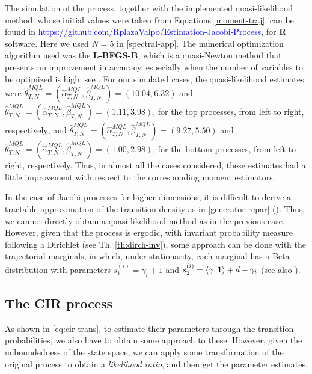 \documentclass[12pt]{article}
\begin{document}
The simulation of the process, together with the implemented quasi-likelihood method, whose initial values were taken from Equations \eqref{moment-traj}, can be found in \textcolor{blue}{https://github.com/RplazaValpo/Estimation-Jacobi-Process}, for \textbf{R} software. Here we used $N=5$ in \eqref{spectral-app}. The numerical optimization algorithm used was the \textbf{L-BFGS-B}, which is a quasi-Newton method that presents an improvement in accuracy, especially when the number of variables to be optimized is high; see \citep{byrd1995limited}.
For our simulated cases, the quasi-likelihood estimates were $\hat{\theta}_{T,N}^{MQL}=(\hat{\alpha}_{T,N}^{MQL},\hat{\beta}_{T,N}^{MQL})=(10.04, 6.32)$ and $\hat{\theta}_{T,N}^{MQL}=(\hat{\alpha}_{T,N}^{MQL},\hat{\beta}_{T,N}^{MQL})=(1.11, 3.98)$, for the top processes, from left to right, respectively; and $\hat{\theta}_{T,N}^{MQL}=(\hat{\alpha}_{T,N}^{MQL},\hat{\beta}_{T,N}^{MQL})=(9.27, 5.50)$ and $\hat{\theta}_{T,N}^{MQL}=(\hat{\alpha}_{T,N}^{MQL},\hat{\beta}_{T,N}^{MQL})=(1.00, 2.98)$,  for the bottom processes, from left to right, respectively. Thus, in almost all the cases considered, these estimates had a little improvement with respect to the corresponding moment estimators.

In the case of Jacobi processes for higher dimensions, it is difficult to derive a tractable approximation of the transition density as in \eqref{generator-repar} (\citep{gourieroux2006multivariate}). Thus, we cannot directly obtain  a quasi-likelihood method as in the previous case. However, given that the process is ergodic, with invariant probability measure following a Dirichlet (see Th. \ref{th:dirch-inv}), some approach can be done with the trajectorial marginals, in which, under stationarity,  each marginal has a Beta distribution with parameters $s_1^{(i)}=\gamma_i+1$ and $s_2^{(i)}=\langle \gamma,\mathbf{1}\rangle+d-\gamma_i$ (see also \citep{ng2011dirichlet}).

\subsection{The CIR process}\label{sec:stat-cir}

As shown in \eqref{eq:cir-trans}, to estimate their parameters through the transition probabilities, we also have to obtain some approach to these. However, given the unboundedness of the state space, we can apply some transformation of the original process to obtain a \textit{likelihood ratio}, and then get the parameter estimates.
\end{document}
